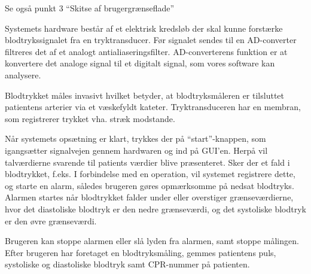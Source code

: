 \vspace{0.7 cm}
Se også punkt 3 “Skitse af brugergrænseflade”


Systemets hardware består af et elektrisk kredsløb der skal kunne forstærke blodtrykssignalet fra en tryktransducer. Før signalet sendes til en AD-converter filtreres det af et analogt antialiaseringsfilter. AD-converterens funktion er at konvertere det analoge signal til et digitalt signal, som vores software kan analysere.

Blodtrykket måles invasivt hvilket betyder, at blodtryksmåleren er tilsluttet patientens arterier via et væskefyldt kateter. Tryktransduceren har en membran, som registrerer trykket vha. stræk modstande.


Når systemets opsætning er klart, trykkes der på “start”-knappen, som igangsætter signalvejen gennem hardwaren og ind på GUI'en. Herpå vil talværdierne svarende til patients værdier blive præsenteret. Sker der et fald i blodtrykket, f.eks. I forbindelse med en operation, vil systemet registrere dette, og starte en alarm, således brugeren gøres opmærksomme på nedsat blodtryks. Alarmen startes når blodtrykket falder under eller overstiger grænseværdierne, hvor det diastoliske blodtryk er den nedre grænseværdi, og det systoliske blodtryk er den øvre grænseværdi.  


Brugeren kan stoppe alarmen eller slå lyden fra alarmen, samt stoppe målingen. Efter brugeren har foretaget en blodtryksmåling, gemmes patientens puls, systoliske og diastoliske blodtryk samt CPR-nummer på patienten.
